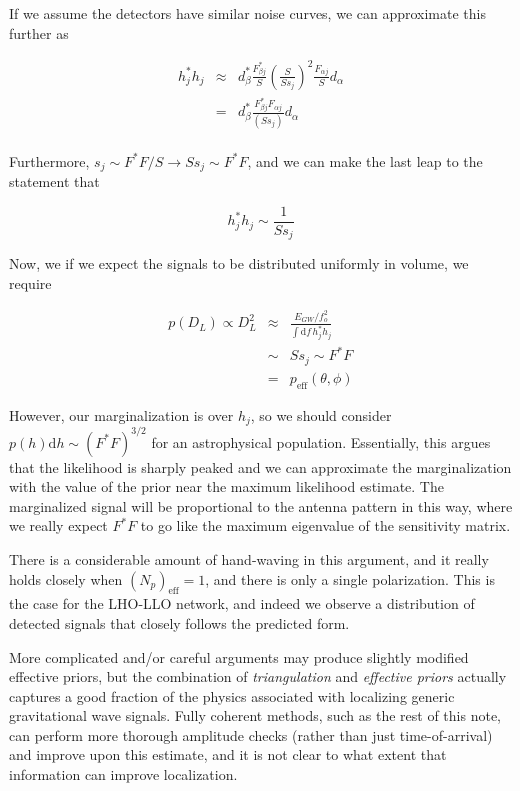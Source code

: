 \documentclass[10pt]{article}
\begin{document}
If we assume the detectors have similar noise curves, we can approximate this further as

\begin{eqnarray}
h_{j}^\ast h_{j} & \approx & d_\beta^\ast \frac{F_{\beta j}^\ast}{S} \left(\frac{S}{S s_j}\right)^{2} \frac{F_{\alpha j}}{S} d_\alpha \\
                 & = & d_\beta^\ast \frac{F_{\beta j}^\ast F_{\alpha j}}{\left(S s_j\right)} d_\alpha \\
\end{eqnarray}

Furthermore, $s_j\sim F^\ast F/ S \rightarrow S s_j \sim F^\ast F$, and we can make the last leap to the statement that

\begin{equation}
h_{j}^\ast h_{j} \sim \frac{1}{S s_j}
\end{equation}

Now, we if we expect the signals to be distributed uniformly in volume, we require

\begin{eqnarray}
p(D_L) \propto D_L^2 & \approx & \frac{E_{GW}/f_o^2}{\int\mathrm{d}f\, h_{j}^\ast h_{j}} \\
                     & \sim & S s_j \sim F^\ast F \\
                     & = & p_{\mathrm{eff}}(\theta,\phi)
\end{eqnarray}

However, our marginalization is over $h_j$, so we should consider $p(h)\mathrm{d}h\sim(F^\ast F)^{3/2}$ for an astrophysical population. Essentially, this argues that the likelihood is sharply peaked and we can approximate the marginalization with the value of the prior near the maximum likelihood estimate. The marginalized signal will be proportional to the antenna pattern in this way, where we really expect $F^\ast F$ to go like the maximum eigenvalue of the sensitivity matrix.

There is a considerable amount of hand-waving in this argument, and it really holds closely when $\left(N_{p}\right)_{\mathrm{eff}} = 1$, and there is only a single polarization. This is the case for the LHO-LLO network, and indeed we observe a distribution of detected signals that closely follows the predicted form. 

More complicated and/or careful arguments may produce slightly modified effective priors, but the combination of \emph{triangulation} and \emph{effective priors} actually captures a good fraction of the physics associated with localizing generic gravitational wave signals. Fully coherent methods, such as the rest of this note, can perform more thorough amplitude checks (rather than just time-of-arrival) and improve upon this estimate, and it is not clear to what extent that information can improve localization.
\end{document}
